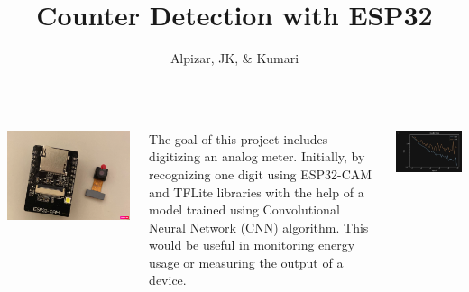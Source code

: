 \documentclass[25pt,a0paper, portrait]{tikzposter}
\title{Counter Detection with ESP32}
\author{Alpizar, JK, \& Kumari}
\begin{document}
	
	
	\maketitle
	
	\begin{columns} 
		
		{
			{
				\begin{tikzfigure}
					\includegraphics[width=\linewidth]{images/ESP32}
				\end{tikzfigure}	
			}
			{
				The goal of this project includes digitizing an analog meter. Initially, by recognizing one digit using ESP32-CAM and TFLite libraries with the help of a model trained using Convolutional Neural Network (CNN) algorithm. This would be useful in monitoring energy usage or measuring the output of a device.
			}
		}
		
		
		{
			{
				\begin{tikzfigure}
					\includegraphics[width=\linewidth]{images/TrainedModel}
				\end{tikzfigure}	
			}
				
			}
	\end{columns}
	
\end{document}

